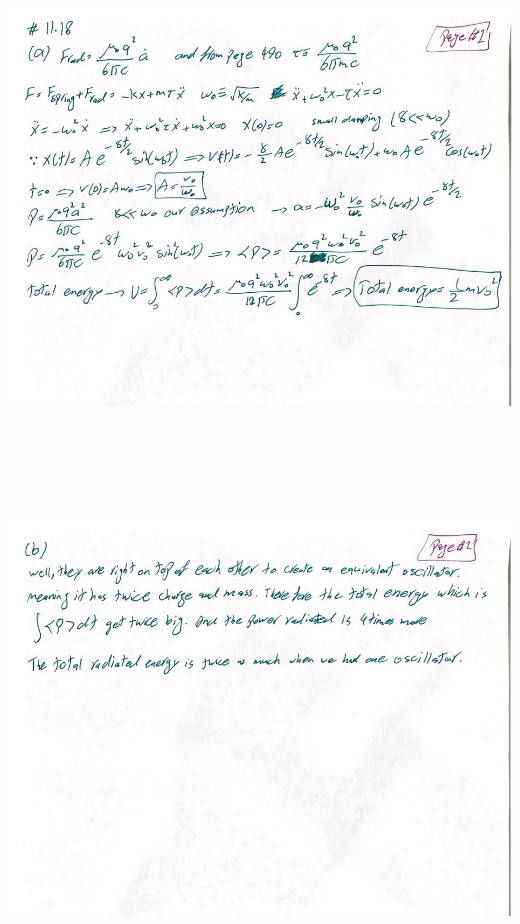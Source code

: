 \documentclass[fleqn]{article}
\begin{document}
\begin{enumerate}
\begin{enumerate}
    \end{enumerate}

    \begin{center}
      \includegraphics[height=13cm, width=15cm]{1118A.JPG}
    \end{center}

    \pagebreak

    \begin{center}
      \includegraphics[height=13cm, width=15cm]{1118B.JPG}
    \end{center}

  \end{enumerate}
\end{document}
